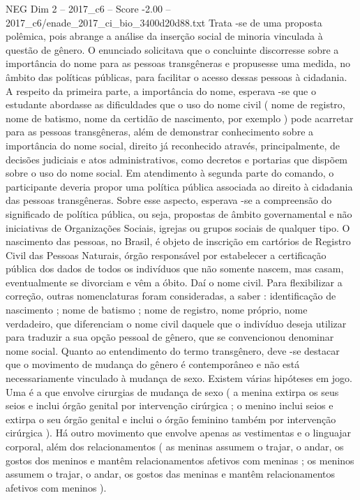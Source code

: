 \begin{textsample}{NEG Dim 2 – 2017\_c6 – Score -2.00 – 2017\_c6/enade\_2017\_ci\_bio\_3400d20d88.txt}
Trata -se de uma proposta polêmica, pois abrange a análise da inserção social de minoria vinculada à questão de gênero.
O enunciado solicitava que o concluinte discorresse sobre a importância do nome para as pessoas transgêneras e propusesse uma medida, no âmbito das políticas públicas, para facilitar o acesso dessas pessoas à cidadania.
A respeito da primeira parte, a importância do nome, esperava -se que o estudante abordasse as dificuldades que o uso do nome civil ( nome de registro, nome de batismo, nome da certidão de nascimento, por exemplo ) pode acarretar para as pessoas transgêneras, além de demonstrar conhecimento sobre a importância do nome social, direito já reconhecido através, principalmente, de decisões judiciais e atos administrativos, como decretos e portarias que dispõem sobre o uso do nome social.
Em atendimento à segunda parte do comando, o participante deveria propor uma política pública associada ao direito à cidadania das pessoas transgêneras.
Sobre esse aspecto, esperava -se a compreensão do significado de política pública, ou seja, propostas de âmbito governamental e não iniciativas de Organizações Sociais, igrejas ou grupos sociais de qualquer tipo.
O nascimento das pessoas, no Brasil, é objeto de inscrição em cartórios de Registro Civil das Pessoas Naturais, órgão responsável por estabelecer a certificação pública dos dados de todos os indivíduos que não somente nascem, mas casam, eventualmente se divorciam e vêm a óbito.
Daí o nome civil.
Para flexibilizar a correção, outras nomenclaturas foram consideradas, a saber : identificação de nascimento ; nome de batismo ; nome de registro, nome próprio, nome verdadeiro, que diferenciam o nome civil daquele que o indivíduo deseja utilizar para traduzir a sua opção pessoal de gênero, que se convencionou denominar nome social.
Quanto ao entendimento do termo transgênero, deve -se destacar que o movimento de mudança do gênero é contemporâneo e não está necessariamente vinculado à mudança de sexo.
Existem várias hipóteses em jogo.
Uma é a que envolve cirurgias de mudança de sexo ( a menina extirpa os seus seios e inclui órgão genital por intervenção cirúrgica ; o menino inclui seios e extirpa o seu órgão genital e inclui o órgão feminino também por intervenção cirúrgica ).
Há outro movimento que envolve apenas as vestimentas e o linguajar corporal, além dos relacionamentos ( as meninas assumem o trajar, o andar, os gostos dos meninos e mantêm relacionamentos afetivos com meninas ; os meninos assumem o trajar, o andar, os gostos das meninas e mantêm relacionamentos afetivos com meninos ).

\end{textsample}
